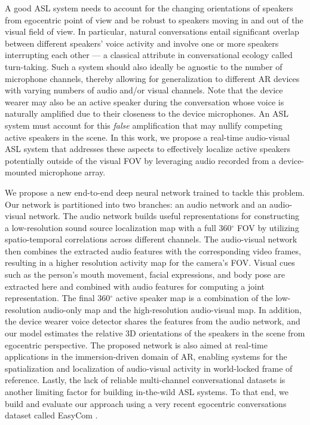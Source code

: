 \documentclass[10pt,twocolumn,letterpaper]{article}
\begin{document}
A good ASL system needs to account for the changing orientations of speakers from egocentric point of view
and be robust to speakers moving in and out of the visual field of view.
In particular, natural conversations entail significant overlap between different speakers' voice activity 
and involve one or more speakers interrupting each other --- a classical attribute in conversational ecology called turn-taking.    
Such a system should also ideally be agnostic to the number of microphone channels, 
thereby allowing for generalization to different AR devices with varying numbers of audio and/or visual channels.  
Note that the device wearer may also be an active speaker during the conversation whose voice is naturally amplified 
due to their closeness to the device microphones. 
An ASL system must account for this {\it false} amplification that may nullify competing active speakers in the scene.
In this work, we propose a real-time audio-visual ASL system that addresses these aspects to 
effectively localize active speakers potentially outside of the visual FOV by leveraging audio recorded from a device-mounted
microphone array. 

We propose a new end-to-end deep neural network trained to tackle this problem. 
Our network is partitioned into two branches: an audio network and an audio-visual network. 
The audio network builds useful representations for constructing a low-resolution sound source localization map with a full 360$^{\circ}$ FOV 
by utilizing spatio-temporal correlations across different channels. 
The audio-visual network then combines the extracted audio features with the corresponding video frames, 
resulting in a higher resolution activity map for the camera's FOV. 
Visual cues such as the person's mouth movement, facial expressions, and body pose are extracted here 
and combined with audio features for computing a joint representation. 
The final 360$^{\circ}$ active speaker map is a combination of the low-resolution audio-only map and the high-resolution audio-visual map.
In addition, the device wearer voice detector shares the features from the audio network, 
and our model estimates the relative 3D orientations of the speakers in the scene from egocentric perspective. 
The proposed network is also aimed at real-time applications in the immersion-driven domain of AR, 
enabling systems for the spatialization and localization of audio-visual activity in world-locked frame of reference.
Lastly, the lack of reliable multi-channel conversational datasets is another limiting factor for building in-the-wild ASL systems. 
To that end, we build and evaluate our approach using a very recent egocentric conversations dataset called EasyCom \cite{easycom}. 
\end{document}
